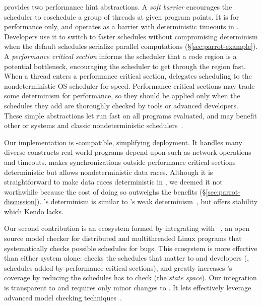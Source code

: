 \parrot provides two performance hint abstractions.  A \emph{soft
  barrier} encourages the scheduler to coschedule a group of threads at
given program points.  It is for performance only, and operates as a
barrier with deterministic timeouts in \parrot.  Developers use it to switch
to faster schedules without compromising determinism
when the default schedules serialize parallel
computations (\S\ref{sec:parrot-example}).  A \emph{performance critical
section}
informs the scheduler that a code region is a potential
bottleneck, encouraging the scheduler to get through the region fast.
When a thread enters a performance critical section, \parrot delegates
scheduling to the
nondeterministic OS scheduler for speed.  
Performance critical sections may trade some determinism for
performance, so they should be applied only when the schedules they add
are thoroughly checked by tools or advanced developers.
These simple abstractions
let \parrot run fast on all programs evaluated, and
may benefit other \dmt or \smt systems and classic nondeterministic
schedulers~\cite{coschedule:sigmetrics96, coschedule, partial-barrier:atc06}.


Our \parrot implementation is \pthread-compatible, simplifying deployment.
It handles many diverse constructs real-world programs depend upon such as
network operations and timeouts.  \parrot makes synchronizations outside
performance critical sections deterministic but allows nondeterministic
data races.  Although it is
straightforward to make data races deterministic in \parrot,
we deemed it not worthwhile because the cost of doing so outweighs the
benefits (\S\ref{sec:parrot-discussion}).  \parrot's determinism is similar to
\kendo's weak determinism~\cite{kendo:asplos09}, but \parrot offers stability
which Kendo lacks.


Our second contribution is an ecosystem formed by integrating \parrot with
\dbug~\cite{dbug:spin11}, an open source model checker for 
distributed and multithreaded Linux programs that systematically checks possible
schedules for bugs.
This \ecosys ecosystem is more effective than
either system alone: \dbug checks the schedules
that matter to \parrot and developers (\eg, schedules added by performance
critical sections), and \parrot greatly increases \dbug's coverage by
reducing the schedules \dbug has to check (the \emph{state space}). Our
integration is transparent to \dbug and requires only minor
changes to \parrot.  It lets \parrot effectively leverage advanced model
checking techniques~\cite{flanagan:dynamicpo, demeter:sosp11}.


